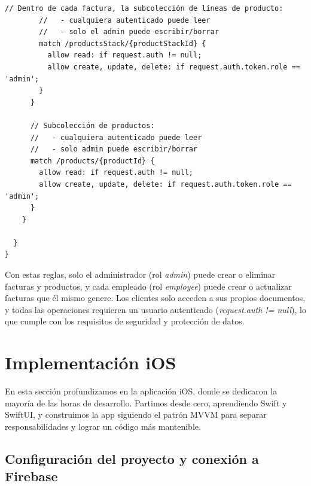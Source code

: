\begin{large}
\begin{lstlisting}[language={}, caption={Reglas de seguridad de Firestore}]
        // Dentro de cada factura, la subcolección de líneas de producto:
        //   - cualquiera autenticado puede leer
        //   - solo el admin puede escribir/borrar
        match /productsStack/{productStackId} {
          allow read: if request.auth != null;
          allow create, update, delete: if request.auth.token.role == 'admin';
        }
      }
      
      // Subcolección de productos: 
      //   - cualquiera autenticado puede leer
      //   - solo admin puede escribir/borrar
      match /products/{productId} {
        allow read: if request.auth != null;
        allow create, update, delete: if request.auth.token.role == 'admin';
      }
    }
    
  }
}
\end{lstlisting}

Con estas reglas, solo el administrador (rol \textit{admin}) puede crear o eliminar facturas y productos, y cada empleado (rol \textit{employee}) puede crear o actualizar facturas que él mismo genere. Los clientes solo acceden a sus propios documentos, y todas las operaciones requieren un usuario autenticado (\textit{request.auth != null}), lo que cumple con los requisitos de seguridad y protección de datos.

\end{large}

\section{Implementación iOS}

\begin{large}

En esta sección profundizamos en la aplicación iOS, donde se dedicaron la mayoría de las horas de desarrollo. Partimos desde cero, aprendiendo Swift y SwiftUI, y construimos la app siguiendo el patrón MVVM para separar responsabilidades y lograr un código más mantenible.

\end{large}

\subsection{Configuración del proyecto y conexión a Firebase}

